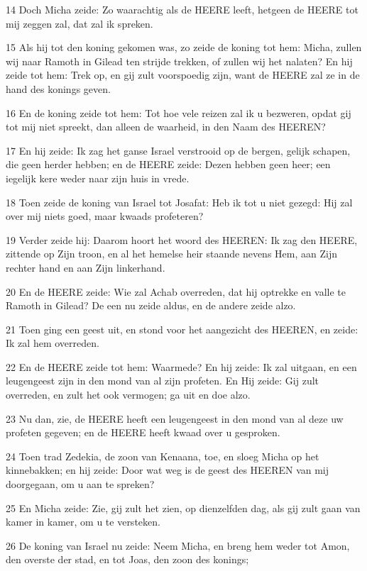 \par 14 Doch Micha zeide: Zo waarachtig als de HEERE leeft, hetgeen de HEERE tot mij zeggen zal, dat zal ik spreken.
\par 15 Als hij tot den koning gekomen was, zo zeide de koning tot hem: Micha, zullen wij naar Ramoth in Gilead ten strijde trekken, of zullen wij het nalaten? En hij zeide tot hem: Trek op, en gij zult voorspoedig zijn, want de HEERE zal ze in de hand des konings geven.
\par 16 En de koning zeide tot hem: Tot hoe vele reizen zal ik u bezweren, opdat gij tot mij niet spreekt, dan alleen de waarheid, in den Naam des HEEREN?
\par 17 En hij zeide: Ik zag het ganse Israel verstrooid op de bergen, gelijk schapen, die geen herder hebben; en de HEERE zeide: Dezen hebben geen heer; een iegelijk kere weder naar zijn huis in vrede.
\par 18 Toen zeide de koning van Israel tot Josafat: Heb ik tot u niet gezegd: Hij zal over mij niets goed, maar kwaads profeteren?
\par 19 Verder zeide hij: Daarom hoort het woord des HEEREN: Ik zag den HEERE, zittende op Zijn troon, en al het hemelse heir staande nevens Hem, aan Zijn rechter hand en aan Zijn linkerhand.
\par 20 En de HEERE zeide: Wie zal Achab overreden, dat hij optrekke en valle te Ramoth in Gilead? De een nu zeide aldus, en de andere zeide alzo.
\par 21 Toen ging een geest uit, en stond voor het aangezicht des HEEREN, en zeide: Ik zal hem overreden.
\par 22 En de HEERE zeide tot hem: Waarmede? En hij zeide: Ik zal uitgaan, en een leugengeest zijn in den mond van al zijn profeten. En Hij zeide: Gij zult overreden, en zult het ook vermogen; ga uit en doe alzo.
\par 23 Nu dan, zie, de HEERE heeft een leugengeest in den mond van al deze uw profeten gegeven; en de HEERE heeft kwaad over u gesproken.
\par 24 Toen trad Zedekia, de zoon van Kenaana, toe, en sloeg Micha op het kinnebakken; en hij zeide: Door wat weg is de geest des HEEREN van mij doorgegaan, om u aan te spreken?
\par 25 En Micha zeide: Zie, gij zult het zien, op dienzelfden dag, als gij zult gaan van kamer in kamer, om u te versteken.
\par 26 De koning van Israel nu zeide: Neem Micha, en breng hem weder tot Amon, den overste der stad, en tot Joas, den zoon des konings;
